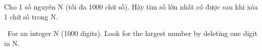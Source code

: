 Cho 1 số nguyên N (tối đa 1000 chữ số). Hãy tìm số lớn nhất có được sau khi xóa 1 chữ số trong N.

 For an integer N (1000 digits). Look for the largest number by deleting one digit in N.